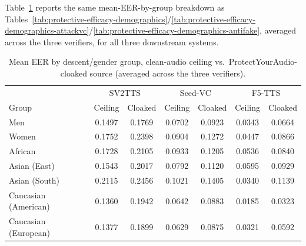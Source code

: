 \documentclass[11pt]{article}
\begin{document}
Table~\ref{tab:protective-efficacy-demographics-protectyouraudio}
reports the same mean-EER-by-group breakdown as
Tables~\ref{tab:protective-efficacy-demographics}/\ref{tab:protective-efficacy-demographics-attackvc}/\ref{tab:protective-efficacy-demographics-antifake},
averaged across the three verifiers, for all three downstream systems.

\begin{table}[H]
\centering
\caption{Mean EER by descent/gender group, clean-audio ceiling vs.\
ProtectYourAudio-cloaked source (averaged across the three verifiers).}
\label{tab:protective-efficacy-demographics-protectyouraudio}
\begin{tabular}{lcccccc}
\toprule
& \multicolumn{2}{c}{SV2TTS} & \multicolumn{2}{c}{Seed-VC} & \multicolumn{2}{c}{F5-TTS} \\
Group & Ceiling & Cloaked & Ceiling & Cloaked & Ceiling & Cloaked \\
\midrule
Men                  & 0.1497 & 0.1769 & 0.0702 & 0.0923 & 0.0343 & 0.0664 \\
Women                & 0.1752 & 0.2398 & 0.0904 & 0.1272 & 0.0447 & 0.0866 \\
\addlinespace
African              & 0.1728 & 0.2105 & 0.0933 & 0.1205 & 0.0536 & 0.0840 \\
Asian (East)         & 0.1543 & 0.2017 & 0.0792 & 0.1120 & 0.0595 & 0.0929 \\
Asian (South)        & 0.2115 & 0.2456 & 0.1021 & 0.1405 & 0.0340 & 0.1139 \\
Caucasian (American)  & 0.1360 & 0.1942 & 0.0642 & 0.0883 & 0.0185 & 0.0323 \\
Caucasian (European)  & 0.1377 & 0.1899 & 0.0629 & 0.0875 & 0.0321 & 0.0592 \\
\bottomrule
\end{tabular}
\end{table}
\end{document}
